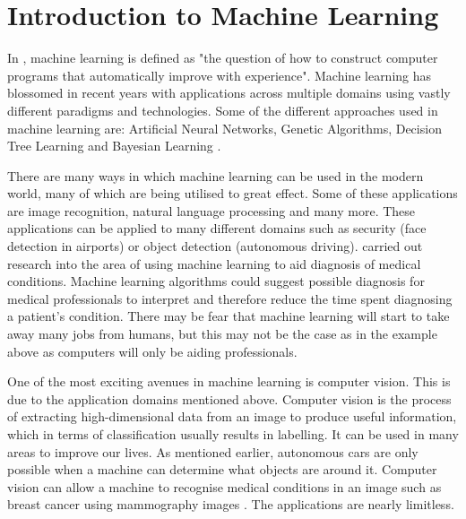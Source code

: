 \section{Introduction to Machine Learning}
In \parencite{MLANN}, machine learning is defined as "the question of how to
construct computer programs that automatically improve with experience".
Machine learning has blossomed in recent years with applications across multiple
domains using vastly different paradigms and technologies. 
Some of the different approaches used in machine learning are: Artificial Neural Networks, Genetic Algorithms, Decision Tree Learning and Bayesian Learning \parencite{MLANN}.

There are many ways in which machine learning can be used in the modern world,
many of which are being utilised to great effect.
Some of these applications are image recognition, natural language
processing and many more.
These applications can be applied to many different domains such as security (face detection in airports) or object detection (autonomous driving).
\parencite{medical} carried out research into the area of using machine learning to aid diagnosis of medical conditions.
Machine learning algorithms could suggest possible diagnosis for medical professionals to interpret and therefore reduce the time spent diagnosing a patient's condition.
There may be fear that machine learning will start to take away many jobs
from
humans, but this may not be the case as in the example above as computers will only be aiding professionals.

One of the most exciting avenues in machine learning is computer
vision.
This is due to the application domains mentioned above. 
Computer vision is the process of extracting high-dimensional data from an image to produce useful information, which in terms of classification usually results in labelling. It can be used in many areas to improve our lives. As
mentioned earlier, autonomous cars are only possible when a machine can
determine what objects are around it.
Computer vision can allow a machine to
recognise medical conditions in an image such as breast cancer using mammography images \parencite{medical}. The applications are nearly limitless.